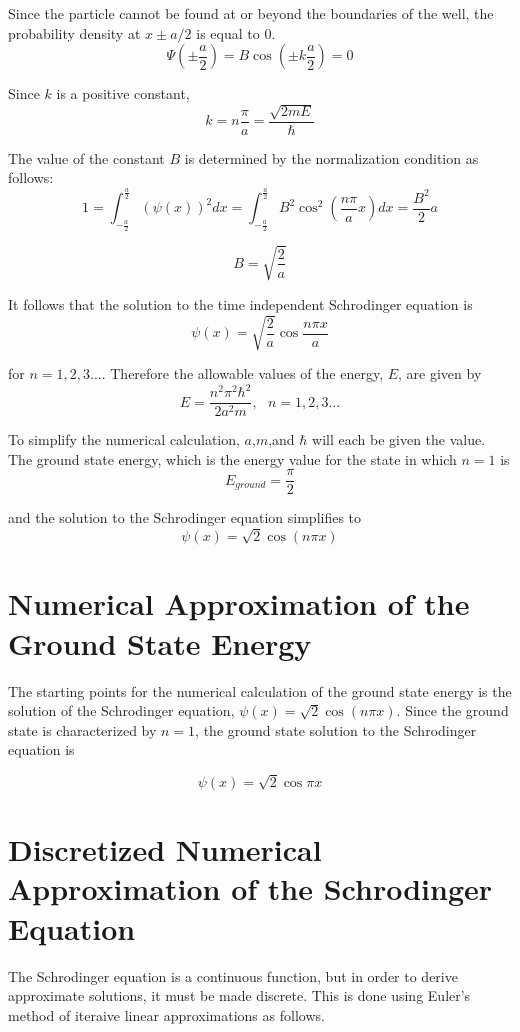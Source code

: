 \documentclass{article}
\begin{document}
Since the particle cannot be found at or beyond the boundaries of the well, the probability density at $x \pm a/2$ is equal to 0.
$$\Psi(\pm \frac{a}{2}) = B \cos{\left(\pm k \frac{a}{2}\right)} = 0$$

Since $k$ is a positive constant,
$$k = n \frac{\pi}{a}= \frac{\sqrt{2mE}}{\hbar}$$

The value of the constant $B$ is determined by the normalization condition as follows:
$$1 = \int_{ - \frac{a}{2}}^{\frac{a}{2}} {{{\left( {\psi \left( x \right)} \right)}^2}dx = \int_{ - \frac{a}{2}}^{\frac{a}{2}} {{B^2}{{\cos }^2}\left( {\frac{{n\pi }}{a}x} \right)dx = \frac{{{B^2}}}{2}a} }$$

$$B = \sqrt{\frac{2}{a}}$$

It follows that the solution to the time independent Schrodinger equation is 
$$\psi(x) = \sqrt{\frac{2}{a}} \cos{\frac{n \pi x}{a}}$$

for $n = 1,2,3...$. Therefore the allowable values of the energy, $E$, are given by
$$ E = \frac{n^2 \pi^2 \hbar^2}{2 a^2m}, \ \ \  n = 1,2,3...$$

To simplify the numerical calculation, $a$,$m$,and $\hbar$ will each be given the value. The ground state energy, which is the energy value for the state in which $n=1$ is
$$E_{ground} = \frac{\pi}{2}$$

and the solution to the Schrodinger equation simplifies to 
$$\psi(x) = \sqrt{2}\cos{(n\pi x)}$$

\section{Numerical Approximation of the Ground State Energy}
The starting points for the numerical calculation of the ground state energy is the solution of the Schrodinger equation, $\psi(x) = \sqrt{2}\cos{(n\pi x)}$. Since the ground state is characterized by $n = 1$, the ground state solution to the Schrodinger equation is 

$$\psi(x) = \sqrt{2} \cos{\pi x}$$

\section{Discretized Numerical Approximation of the Schrodinger Equation}
The Schrodinger equation is a continuous function, but in order to derive approximate solutions, it must be made discrete. This is done using Euler's method of iteraive linear approximations as follows.
\end{document}
